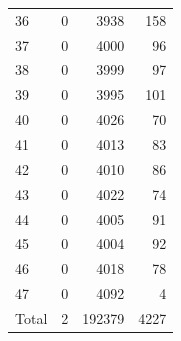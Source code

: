 \begin{table}
\begin{tabular}{lrrr}
36 & 0 & 3938 & 158 \\
37 & 0 & 4000 & 96 \\
38 & 0 & 3999 & 97 \\
39 & 0 & 3995 & 101 \\
40 & 0 & 4026 & 70 \\
41 & 0 & 4013 & 83 \\
42 & 0 & 4010 & 86 \\
43 & 0 & 4022 & 74 \\
44 & 0 & 4005 & 91 \\
45 & 0 & 4004 & 92 \\
46 & 0 & 4018 & 78 \\
47 & 0 & 4092 & 4 \\
Total & 2 & 192379 & 4227 \\
\end{tabular}
\end{table}
